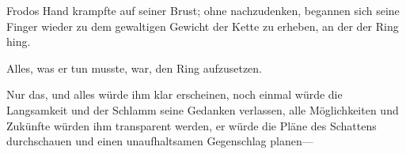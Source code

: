 Frodos Hand krampfte auf seiner Brust; ohne nachzudenken, begannen sich seine Finger wieder zu dem gewaltigen Gewicht der Kette zu erheben, an der der Ring hing.

Alles, was er tun musste, war, den Ring aufzusetzen.


Nur das, und alles würde ihm klar erscheinen, noch einmal würde die Langsamkeit und der Schlamm seine Gedanken verlassen, alle Möglichkeiten und Zukünfte würden ihm transparent werden, er würde die Pläne des Schattens durchschauen und einen unaufhaltsamen Gegenschlag planen—


